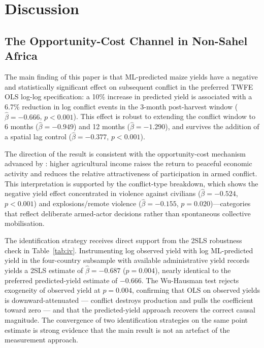 \section{Discussion}
\label{sec:discussion}

\subsection{The Opportunity-Cost Channel in Non-Sahel Africa}

The main finding of this paper is that ML-predicted maize yields have a negative and statistically significant effect on subsequent conflict in the preferred TWFE OLS log-log specification: a 10\% increase in predicted yield is associated with a 6.7\% reduction in log conflict events in the 3-month post-harvest window ($\hat{\beta} = -0.666$, $p < 0.001$). This effect is robust to extending the conflict window to 6 months ($\hat{\beta} = -0.949$) and 12 months ($\hat{\beta} = -1.290$), and survives the addition of a spatial lag control ($\hat{\beta} = -0.377$, $p < 0.001$).

The direction of the result is consistent with the opportunity-cost mechanism advanced by \citet{DalBoDalBo2011}: higher agricultural income raises the return to peaceful economic activity and reduces the relative attractiveness of participation in armed conflict. This interpretation is supported by the conflict-type breakdown, which shows the negative yield effect concentrated in violence against civilians ($\hat{\beta} = -0.524$, $p < 0.001$) and explosions/remote violence ($\hat{\beta} = -0.155$, $p = 0.020$)---categories that reflect deliberate armed-actor decisions rather than spontaneous collective mobilisation.

The identification strategy receives direct support from the 2SLS robustness check in Table~\ref{tab:iv}. Instrumenting log observed yield with log ML-predicted yield in the four-country subsample with available administrative yield records yields a 2SLS estimate of $\hat{\beta} = -0.687$ ($p = 0.004$), nearly identical to the preferred predicted-yield estimate of $-0.666$. The Wu-Hausman test rejects exogeneity of observed yield at $p = 0.004$, confirming that OLS on observed yields is downward-attenuated --- conflict destroys production and pulls the coefficient toward zero --- and that the predicted-yield approach recovers the correct causal magnitude. The convergence of two identification strategies on the same point estimate is strong evidence that the main result is not an artefact of the measurement approach.

